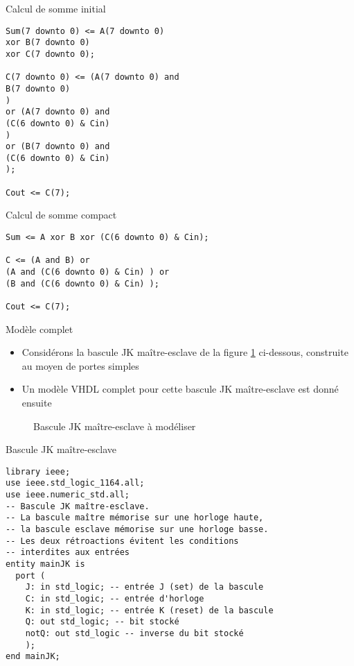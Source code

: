 \documentclass[presentation]{beamer}
\begin{document}
\begin{frame}[label={sec:orgc63ec14},fragile]{Calcul de somme initial}
 \begin{verbatim}
Sum(7 downto 0) <= A(7 downto 0)
xor B(7 downto 0)
xor C(7 downto 0);

C(7 downto 0) <= (A(7 downto 0) and
B(7 downto 0)
)
or (A(7 downto 0) and
(C(6 downto 0) & Cin)
)
or (B(7 downto 0) and
(C(6 downto 0) & Cin)
);

Cout <= C(7);
\end{verbatim}
\end{frame}

\begin{frame}[label={sec:org8a6172c},fragile]{Calcul de somme compact}
 \begin{verbatim}
Sum <= A xor B xor (C(6 downto 0) & Cin);

C <= (A and B) or
(A and (C(6 downto 0) & Cin) ) or
(B and (C(6 downto 0) & Cin) );

Cout <= C(7);
\end{verbatim}
\end{frame}

\begin{frame}[label={sec:orga3b737c}]{Modèle complet}
\begin{itemize}
\item Considérons la bascule JK maître-esclave de la figure \ref{fig:org4386d95} ci-dessous, construite au moyen de portes simples
\item Un modèle VHDL complet pour cette bascule JK maître-esclave est donné ensuite
\end{itemize}

\begin{figure}[htbp]
\centering

\caption{\label{fig:org4386d95}Bascule JK maître-esclave à modéliser}
\end{figure}
\end{frame}

\begin{frame}[label={sec:org94f0368},fragile]{Bascule JK maître-esclave}
 \begin{verbatim}
library ieee;
use ieee.std_logic_1164.all;
use ieee.numeric_std.all;
-- Bascule JK maître-esclave.
-- La bascule maître mémorise sur une horloge haute, 
-- la bascule esclave mémorise sur une horloge basse. 
-- Les deux rétroactions évitent les conditions 
-- interdites aux entrées 
entity mainJK is
  port (
    J: in std_logic; -- entrée J (set) de la bascule
    C: in std_logic; -- entrée d'horloge
    K: in std_logic; -- entrée K (reset) de la bascule
    Q: out std_logic; -- bit stocké
    notQ: out std_logic -- inverse du bit stocké
    );
end mainJK;
\end{verbatim}
\end{frame}
\end{document}
